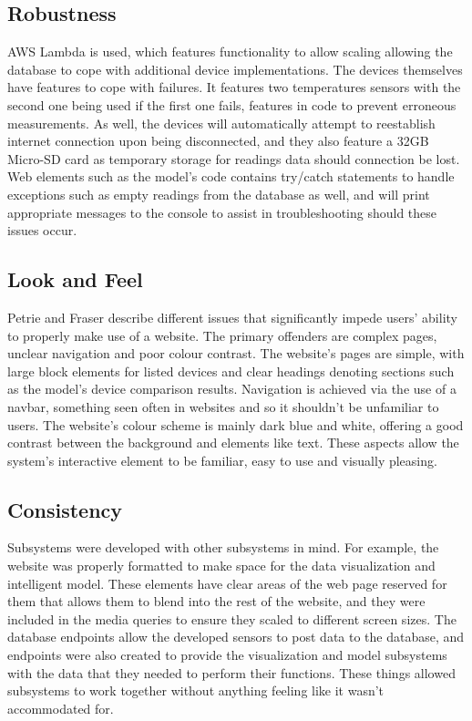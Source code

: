 \documentclass[]{report}
\begin{document}
	\subsection{Robustness}
	AWS Lambda is used, which features functionality to allow scaling\cite{awslambdadocs} allowing the database to cope with additional device implementations. The devices themselves have features to cope with failures. It features two temperatures sensors with the second one being used if the first one fails, features in code to prevent erroneous measurements. As well, the devices will automatically attempt to reestablish internet connection upon being disconnected, and they also feature a 32GB Micro-SD card as temporary storage for readings data should connection be lost. Web elements such as the model's code contains try/catch statements to handle exceptions such as empty readings from the database as well, and will print appropriate messages to the console to assist in troubleshooting should these issues occur.
	
	\subsection{Look and Feel}
	Petrie and Fraser\cite{petrie2004tension} describe different issues that significantly impede users' ability to properly make use of a website. The primary offenders are complex pages, unclear navigation and poor colour contrast. The website's pages are simple, with large block elements for listed devices and clear headings denoting sections such as the model's device comparison results. Navigation is achieved via the use of a navbar, something seen often in websites and so it shouldn't be unfamiliar to users. The website's colour scheme is mainly dark blue and white, offering a good contrast between the background and elements like text. These aspects allow the system's interactive element to be familiar, easy to use and visually pleasing.
	
	\subsection{Consistency}
	Subsystems were developed with other subsystems in mind. For example, the website was properly formatted to make space for the data visualization and intelligent model. These elements have clear areas of the web page reserved for them that allows them to blend into the rest of the website, and they were included in the media queries to ensure they scaled to different screen sizes. The database endpoints allow the developed sensors to post data to the database, and endpoints were also created to provide the visualization and model subsystems with the data that they needed to perform their functions. These things allowed subsystems to work together without anything feeling like it wasn't accommodated for.
	
\end{document}
